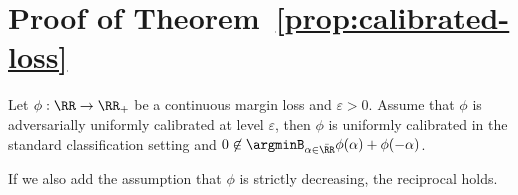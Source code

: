 \section{Proof of Theorem~\ref{prop:calibrated-loss}}
\begin{thm*} 

Let $\phi:\RR\to\RR_+$  be a continuous margin loss and $\varepsilon>0$. Assume that $\phi$ is adversarially uniformly calibrated at level $\varepsilon$, then $\phi$ is uniformly calibrated in the standard classification setting and $0\not\in \argminB_{\alpha\in\bar{\RR}}
\phi(\alpha)+\phi(-\alpha)$.

If we also add the assumption that $\phi$ is strictly decreasing, the reciprocal holds.

\end{thm*}
